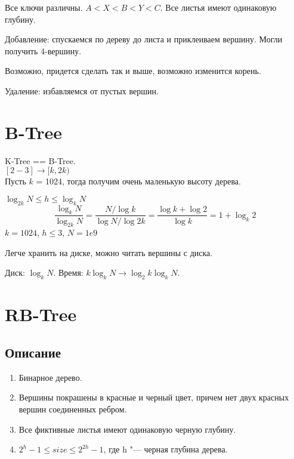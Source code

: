 
Все ключи различны. $A < X < B < Y < C$. Все листья имеют одинаковую глубину.

Добавление: спускаемся по дереву до листа и приклеиваем вершину. Могли получить 4-вершину.


Возможно, придется сделать так и выше, возможно изменится корень.

Удаление: избавляемся от пустых вершин.



\section{B-Tree}

K-Tree == B-Tree.\\

$[2-3] \longrightarrow [k, 2k)$\\

Пусть $k$ = 1024, тогда получим очень маленькую высоту дерева.

$\log_{2k}{N} \leqslant h \leqslant \log_{k}{N}$
\[ \frac{\log_{k}{N}}{\log_{2k}{N}} = \frac{N/\log{k}}{\log{N}/\log{2k}} = \frac{\log{k} + \log{2}}{\log{k}} = 1 + \log_{k}{2} \]
$k = 1024$, $h \leqslant 3$, $N = 1e9$

Легче хранить на диске, можно читать вершины с диска.

Диск: $\log_{k}{N}$. Время: $k\log_{k}{N} \longrightarrow \log_{2}{k} \log_{k}{N}$.

\section{RB-Tree}

\subsection{Описание}
\begin{enumerate}
	\item Бинарное дерево.
	\item Вершины покрашены в красные и черный цвет, причем нет двух красных вершин соединенных ребром.
	\item Все фиктивные листья имеют одинаковую черную глубину.
	\item $2^{h} - 1 \leqslant size \leqslant 2^{2h} - 1$, где h "--- черная глубина дерева.
\end{enumerate}

